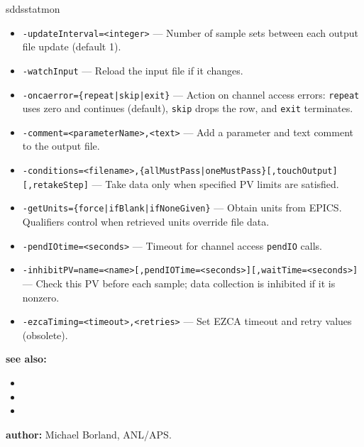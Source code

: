 \begin{sddsprog}{sddsstatmon}
\begin{itemize}
  \item {\tt -updateInterval=<integer>} --- Number of sample sets between each output file update (default 1).
  \item {\tt -watchInput} --- Reload the input file if it changes.
  \item {\tt -oncaerror=\{repeat|skip|exit\}} --- Action on channel access errors: \verb+repeat+ uses zero and continues (default), \verb+skip+ drops the row, and \verb+exit+ terminates.
  \item {\tt -comment=<parameterName>,<text>} --- Add a parameter and text comment to the output file.
  \item {\tt -conditions=<filename>,\{allMustPass|oneMustPass\}[,touchOutput][,retakeStep]} --- Take data only when specified PV limits are satisfied.
  \item {\tt -getUnits=\{force|ifBlank|ifNoneGiven\}} --- Obtain units from EPICS. Qualifiers control when retrieved units override file data.
  \item {\tt -pendIOtime=<seconds>} --- Timeout for channel access \verb+pendIO+ calls.
  \item {\tt -inhibitPV=name=<name>[,pendIOTime=<seconds>][,waitTime=<seconds>]} --- Check this PV before each sample; data collection is inhibited if it is nonzero.
  \item {\tt -ezcaTiming=<timeout>,<retries>} --- Set EZCA timeout and retry values (obsolete).
\end{itemize}

\item \textbf{see also:}
\begin{itemize}
  \item {}
  \item {}
  \item {}
\end{itemize}
\item \textbf{author:} Michael Borland, ANL/APS.
\end{sddsprog}
